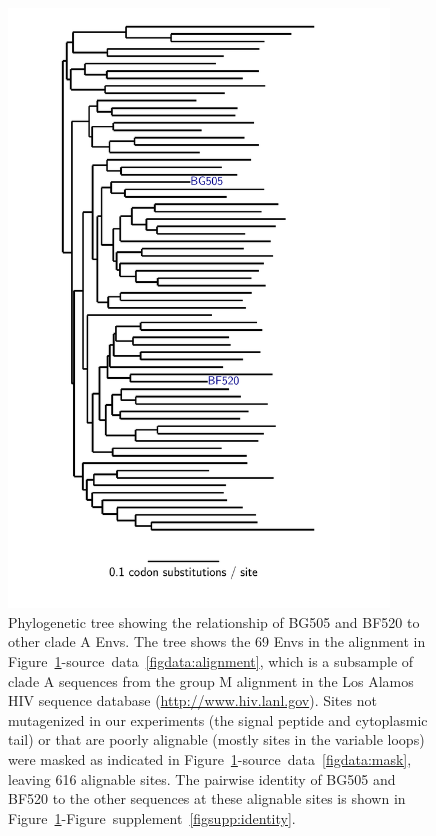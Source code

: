 \documentclass[9pt]{elife}
\begin{document}
\begin{figure}
\centerline{\includegraphics[clip=true, trim= 0in 0in 1in 0in, angle=-90, width=0.9\textwidth]{figures/tree_plot.pdf}}
\caption{\label{fig:tree}
Phylogenetic tree showing the relationship of BG505 and BF520 to other clade A Envs.
The tree shows the 69 Envs in the alignment in Figure~\ref{fig:tree}-source~data~\ref{figdata:alignment}, which is a subsample of clade A sequences from the group M alignment in the Los Alamos HIV sequence database (\url{http://www.hiv.lanl.gov}).
Sites not mutagenized in our experiments (the signal peptide and cytoplasmic tail) or that are poorly alignable (mostly sites in the variable loops) were masked as indicated in Figure~\ref{fig:tree}-source~data~\ref{figdata:mask}, leaving 616 alignable sites.
The pairwise identity of BG505 and BF520 to the other sequences at these alignable sites is shown in Figure~\ref{fig:tree}-Figure~supplement~\ref{figsupp:identity}.
}
\end{figure}
\end{document}
